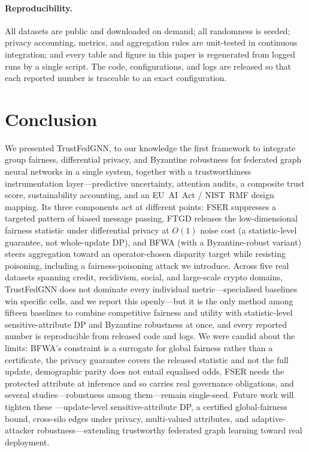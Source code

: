 \documentclass[pdflatex,sn-mathphys-num]{sn-jnl}
\theoremstyle{thmstyleone}%
\theoremstyle{thmstyletwo}%
\theoremstyle{thmstylethree}%
\begin{document}
\paragraph{Reproducibility.}
All datasets are public and downloaded on demand; all randomness is seeded;
privacy accounting, metrics, and aggregation rules are unit-tested in continuous
integration; and every table and figure in this paper is regenerated from logged
runs by a single script. The code, configurations, and logs are released so that
each reported number is traceable to an exact configuration.

\section{Conclusion}
\label{sec:conclusion}

We presented TrustFedGNN, to our knowledge the first framework to integrate
group fairness, differential privacy, and Byzantine robustness for federated
graph neural networks in a single system, together with a trustworthiness
instrumentation layer---predictive uncertainty, attention audits, a composite
trust score, sustainability accounting, and an EU~AI~Act / NIST~RMF design
mapping. Its three components act at different points: FSER suppresses a
targeted pattern of biased message passing, FTGD releases the low-dimensional
fairness statistic under differential privacy at $O(1)$ noise cost (a
statistic-level guarantee, not whole-update DP), and BFWA (with a
Byzantine-robust variant) steers aggregation toward an operator-chosen disparity
target while resisting poisoning, including a fairness-poisoning attack we
introduce. Across five real datasets spanning credit, recidivism, social, and
large-scale crypto domains, TrustFedGNN does not dominate every individual
metric---specialised baselines win specific cells, and we report this
openly---but it is the only method among fifteen baselines to combine
competitive fairness and utility with statistic-level sensitive-attribute DP and
Byzantine robustness at once, and every reported number is reproducible from
released code
and logs. We were candid about the limits: BFWA's constraint is a surrogate for
global fairness rather than a certificate, the privacy guarantee covers the
released statistic and not the full update, demographic parity does not entail
equalised odds, FSER needs the protected attribute at inference and so carries
real governance obligations, and several studies---robustness among
them---remain single-seed. Future work will tighten these
---update-level sensitive-attribute DP, a certified global-fairness bound,
cross-silo edges under privacy, multi-valued attributes, and adaptive-attacker
robustness---extending trustworthy federated graph learning toward real
deployment.
\end{document}
